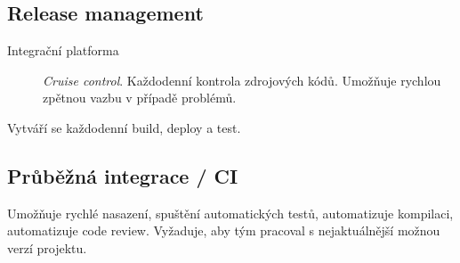   \subsection{Release management}
    \begin{description}
      \item[Integrační platforma] \emph{Cruise control}. Každodenní kontrola zdrojových kódů. Umožňuje
      rychlou zpětnou vazbu v případě problémů.
    \end{description}
    Vytváří se každodenní build, deploy a test.

  \subsection{Průběžná integrace / CI}
    Umožňuje rychlé nasazení, spuštění automatických testů, automatizuje kompilaci, automatizuje code review.
    Vyžaduje, aby tým pracoval s nejaktuálnější možnou verzí projektu.
